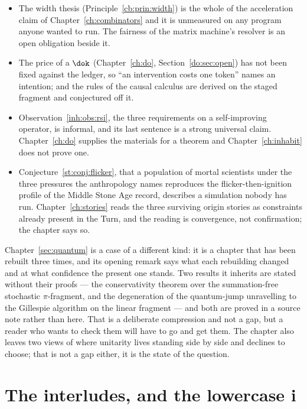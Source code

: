 \begin{itemize}[leftmargin=1.6em, itemsep=4pt]
      covers a fragment --- no joins, no patterns --- of what the
      store implements.
\item The width thesis (Principle~\ref{cb:prin:width}) is the
      whole of the acceleration claim of Chapter~\ref{ch:combinators}
      and it is unmeasured on any program anyone wanted to run.
      The fairness of the matrix machine's resolver is an open
      obligation beside it.
\item The price of a $\dok$ (Chapter~\ref{ch:do},
      Section~\ref{do:sec:open}) has not been fixed against the
      ledger, so ``an intervention costs one token'' names an
      intention; and the rules of the causal calculus are derived on
      the staged fragment and conjectured off it.
\item Observation~\ref{inh:obs:rsi}, the three requirements on a
      self-improving operator, is informal, and its last sentence is
      a strong universal claim.
      Chapter~\ref{ch:do} supplies the materials for a theorem and
      Chapter~\ref{ch:inhabit} does not prove one.
\item Conjecture~\ref{st:conj:flicker}, that a population of mortal
      scientists under the three pressures the anthropology names
      reproduces the flicker-then-ignition profile of the Middle Stone
      Age record, describes a simulation nobody has run.
      Chapter~\ref{ch:stories} reads the three surviving origin stories
      as constraints already present in the Turn, and the reading is
      convergence, not confirmation; the chapter says so.
\end{itemize}

\noindent
Chapter~\ref{sec:quantum} is a case of a different kind: it is a
chapter that has been rebuilt three times, and its opening remark
says what each rebuilding changed and at what confidence the present
one stands.
Two results it inherits are stated without their proofs --- the
conservativity theorem over the summation-free stochastic
$\pi$-fragment, and the degeneration of the quantum-jump unravelling
to the Gillespie algorithm on the linear fragment --- and both are
proved in a source note rather than here.
That is a deliberate compression and not a gap, but a reader who
wants to check them will have to go and get them.
The chapter also leaves two views of where unitarity lives standing
side by side and declines to choose; that is not a gap either, it is
the state of the question.

\section*{The interludes, and the lowercase i}

